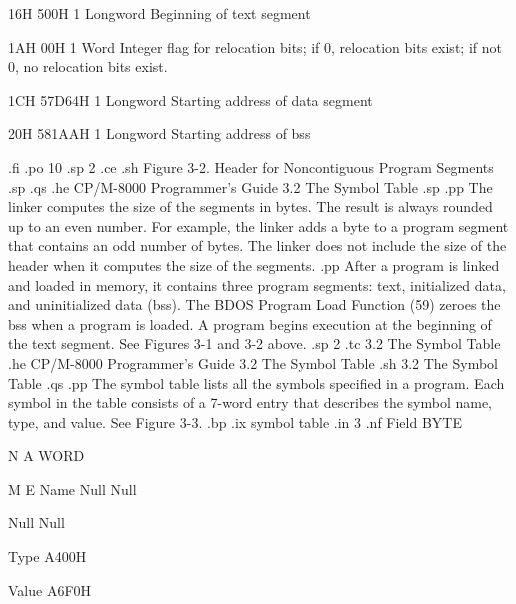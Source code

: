 16H          500H           1 Longword   Beginning of text segment 
      
1AH       00H        
                            1 Word       Integer flag for relocation bits;
                                         if 0, relocation bits exist; if 
                                         not 0, no relocation bits exist.
                         
      
 1CH       57D64H           1 Longword   Starting address of data segment
      
 20H       581AAH           1 Longword   Starting address of bss
      
.fi
.po 10
.sp 2
.ce
.sh
Figure 3-2.  Header for Noncontiguous Program Segments
.sp
.qs
.he CP/M-8000 Programmer's Guide                 3.2  The Symbol Table
.sp
.pp
The linker computes the size of the segments in bytes.  The result is always
rounded up to an even number.  For example, the linker adds a byte to a program
segment that contains an odd number of bytes.  The linker does not include the 
size of the header when it computes the size of the segments. 
.pp
After a program is linked and loaded in memory, it contains three 
program segments:
text, initialized data, and uninitialized data (bss).  
The BDOS Program Load Function (59) zeroes the
bss when a program is loaded.  A program begins
execution at the beginning of the text segment.  See Figures 3-1 and 3-2 
above. 
.sp 2
.tc    3.2  The Symbol Table
.he CP/M-8000 Programmer's Guide                 3.2  The Symbol Table
.sh
3.2  The Symbol Table 
.qs
.pp
The symbol table lists all the symbols specified in a program.  
Each symbol in the table consists of a 7-word entry that describes the symbol 
name, type, and value.  See Figure 3-3.
.bp
.ix symbol table
.in 3
.nf
          Field     BYTE
   
                          N               A         WORD
               
                          M               E        
          Name    
                        Null            Null       
 
                        Null            Null       
                  
          Type                A400H                
                  
                
          Value               A6F0H 
                
